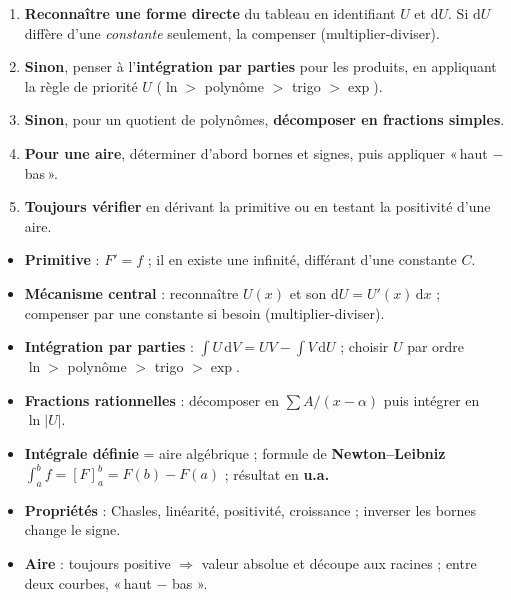\documentclass[11pt,a4paper]{article}
\newcommand{\dd}{\mathrm{d}}
\begin{document}
\begin{methode}
\begin{enumerate}[leftmargin=1.8em,topsep=2pt,itemsep=2pt]
  \item \textbf{Reconnaître une forme directe} du tableau en identifiant $U$ et $\dd U$. Si
        $\dd U$ diffère d'une \emph{constante} seulement, la compenser (multiplier-diviser).
  \item \textbf{Sinon}, penser à l'\textbf{intégration par parties} pour les produits, en
        appliquant la règle de priorité $U$ ($\ln>$ polynôme $>$ trigo $>\exp$).
  \item \textbf{Sinon}, pour un quotient de polynômes, \textbf{décomposer en fractions simples}.
  \item \textbf{Pour une aire}, déterminer d'abord bornes et signes, puis appliquer
        «\,haut $-$ bas\,».
  \item \textbf{Toujours vérifier} en dérivant la primitive ou en testant la positivité d'une aire.
\end{enumerate}
\end{methode}

\begin{tcolorbox}[boxbase,colback=primarydark!6,colframe=primarydark,
   title={\textsc{L'essentiel de la Fiche 7}}]
\begin{itemize}[leftmargin=1.5em,topsep=2pt,itemsep=2pt]
  \item \textbf{Primitive} : $F'=f$ ; il en existe une infinité, différant d'une constante $C$.
  \item \textbf{Mécanisme central} : reconnaître $U(x)$ et son $\dd U=U'(x)\,\dd x$ ; compenser par
        une constante si besoin (multiplier-diviser).
  \item \textbf{Intégration par parties} : $\int U\,\dd V=UV-\int V\,\dd U$ ; choisir $U$ par ordre
        $\ln>$ polynôme $>$ trigo $>\exp$.
  \item \textbf{Fractions rationnelles} : décomposer en $\sum A/(x-\alpha)$ puis intégrer en $\ln|U|$.
  \item \textbf{Intégrale définie} = aire algébrique ; formule de \textbf{Newton--Leibniz}
        $\int_a^b f=[F]_a^b=F(b)-F(a)$ ; résultat en \textbf{u.a.}
  \item \textbf{Propriétés} : Chasles, linéarité, positivité, croissance ; inverser les bornes
        change le signe.
  \item \textbf{Aire} : toujours positive $\Rightarrow$ valeur absolue et découpe aux racines ;
        entre deux courbes, «\,haut $-$ bas\,$\,$».
\end{itemize}
\end{tcolorbox}
\end{document}
